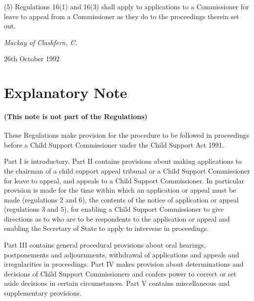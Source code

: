 \documentclass[a4paper]{article}
\newcommand{\parthead}{}
\begin{document}
(5) Regulations 16(1) and 16(3) shall apply to applications to a Commissioner for leave to appeal from a Commissioner as they do to the proceedings therein set out.

\bigskip

{\raggedleft
\emph{Mackay of Clashfern, C.}


}

26th October 1992

\part{Explanatory Note}

\renewcommand\parthead{--- Explanatory Note}

\subsection*{(This note is not part of the Regulations)}

 These Regulations make provision for the procedure to be followed in proceedings before a Child Support Commissioner under the Child Support Act 1991.

  Part I is introductory. Part II contains provisions about making applications to the chairman of a child support appeal tribunal or a Child Support Commissioner for leave to appeal, and appeals to a Child Support Commissioner. In particular provision is made for the time within which an application or appeal must be made (regulations 2 and 6), the contents of the notice of application or appeal (regulations 3 and 5), for enabling a Child Support Commissioner to give directions as to who are to be respondents to the application or appeal and enabling the Secretary of State to apply to intervene in proceedings.

  Part III contains general procedural provisions about oral hearings, postponements and adjournments, withdrawal of applications and appeals and irregularities in proceedings. Part IV makes provision about determinations and decisions of Child Support Commissioners and confers power to correct or set aside decisions in certain circumstances. Part V contains miscellaneous and supplementary provisions.
\end{document}
